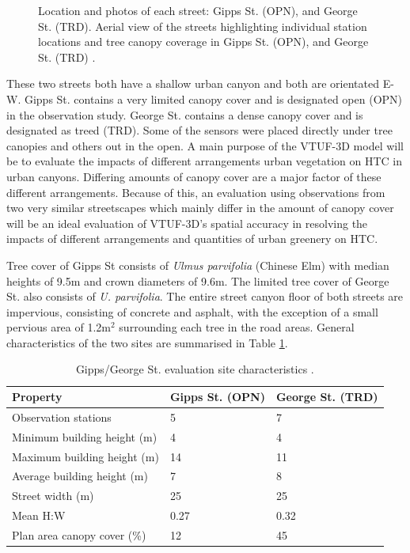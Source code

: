 \documentclass[final,3p,times,authoryear]{elsarticle}
\begin{document}
\begin{figure}[!htbp]
\caption{Location and photos of each street: Gipps St. (OPN), and George St. (TRD). Aerial view of the streets highlighting individual station locations and tree canopy coverage in Gipps St. (OPN), and George St. (TRD) \citep[p.58]{Coutts2015}.\label{fig:GeorgeGippsSt2}} 
\end{figure}

These two streets both have a shallow urban canyon and both are orientated E-W. Gipps St. contains a very limited canopy cover and is designated open (OPN) in the observation study. George St. contains a dense canopy cover and is designated as treed (TRD). Some of the sensors were placed directly under tree canopies and others out in the open. A main purpose of the VTUF-3D model will be to evaluate the impacts of different arrangements urban vegetation on HTC in urban canyons. Differing amounts of canopy cover are a major factor of these different arrangements. Because of this, an evaluation using observations from two very similar streetscapes which mainly differ in the amount of canopy cover will be an ideal evaluation of VTUF-3D's spatial accuracy in resolving the impacts of different arrangements and quantities of urban greenery on HTC.

Tree cover of Gipps St consists of \textit{Ulmus parvifolia} (Chinese Elm) with median heights of 9.5m and crown diameters of 9.6m. The limited tree cover of George St. also consists of \textit{U. parvifolia}. The entire street canyon floor of both streets are impervious, consisting of concrete and asphalt, with the exception of a small pervious area of 1.2m$^{2}$ surrounding each tree in the road areas. General characteristics of the two sites are summarised in Table \ref{tab:comvalpara}.

\begin{table}[!htbp]
\caption{Gipps/George St. evaluation site characteristics \citep{Coutts2015}. \label{tab:comvalpara}}     
\begin{tabular}{| l | l |l|}
\hline
\textbf{Property} & \textbf{Gipps St. (OPN)} & \textbf{George St. (TRD)} \\ \hline
Observation stations & 5 & 7\\ \hline
Minimum building height (m) & 4 & 4\\ \hline
Maximum building height (m) & 14 & 11\\ \hline
Average building height (m) & 7 & 8 \\ \hline
Street width (m) & 25 & 25 \\ \hline
Mean H:W & 0.27 & 0.32 \\ \hline
Plan area canopy cover (\%) & 12 & 45 \\ \hline

\end{tabular}
\end{table}
\end{document}

